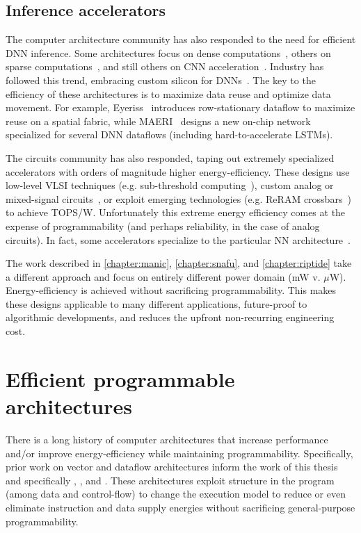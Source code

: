 \subsection{Inference accelerators}
The computer architecture community has also responded to the need for efficient DNN inference.
% 
Some architectures focus on dense computations~\cite{chen:isca16:eyeriss,
chen:asplos14:diannao, chen2014dadiannao}, others on sparse
computations~\cite{han:isca16:eie, du:isca15:shidiannao, maeri,
zhang2016cambricon}, and still others on CNN
acceleration~\cite{alwani2016fused,parashar:isca17:scnn, albericio2016cnvlutin, ding2017circnn, ren2017sc, song2018insitu}.  
%
Industry has followed this trend, embracing custom silicon for
DNNs~\cite{jouppi:isca17:tpu}.
% 
The key to the efficiency of these architectures is to maximize data reuse and
optimize data movement.
% 
For example, Eyeriss~\cite{chen:isca16:eyeriss} introduces row-stationary dataflow to maximize reuse on a spatial fabric, while MAERI~\cite{maeri} designs a new on-chip network specialized for several DNN dataflows (including hard-to-accelerate LSTMs).

The circuits community has also responded, taping out extremely specialized accelerators with orders of magnitude higher energy-efficiency.
%
These designs use low-level VLSI techniques (e.g. sub-threshold computing~\cite{fick2017subthresholdinference}), custom analog or mixed-signal circuits~\cite{bankman2018always}, or exploit emerging technologies (e.g. ReRAM crossbars~\cite{xue201924,xue202015}) to achieve TOPS/W.
% 
Unfortunately this extreme energy efficiency comes at the expense of programmability (and perhaps reliability, in the case of analog circuits).
% 
In fact, some accelerators specialize to the particular NN architecture~\cite{bankman2018always}.

The work described in \autoref{chapter:manic}, \autoref{chapter:snafu}, and \autoref{chapter:riptide} take a different approach and focus on entirely different power domain (mW v. $\mu$W).
% 
Energy-efficiency is achieved without sacrificing programmability.
% 
This makes these designs applicable to many different applications, future-proof to algorithmic developments, and reduces the upfront non-recurring engineering cost.

\section{Efficient programmable architectures}
There is a long history of computer architectures that increase performance and/or improve energy-efficiency while maintaining programmability.
% 
Specifically, prior work on vector and dataflow architectures inform the work of this thesis and specifically \manic, \snafu, and \riptide.
% 
% 
These architectures exploit structure in the program (among data and control-flow) to change the execution model to reduce or even eliminate instruction and data supply energies without sacrificing general-purpose programmability.

